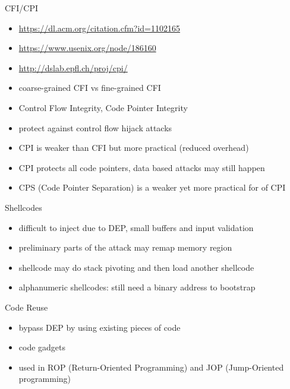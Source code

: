 \documentclass{curs}
\begin{document}
\begin{frame}{CFI/CPI}
  \begin{itemize}
    \item \url{https://dl.acm.org/citation.cfm?id=1102165}
    \item \url{https://www.usenix.org/node/186160}
    \item \url{http://dslab.epfl.ch/proj/cpi/}
    \item coarse-grained CFI vs fine-grained CFI
    \item Control Flow Integrity, Code Pointer Integrity
    \item protect against control flow hijack attacks
    \item CPI is weaker than CFI but more practical (reduced overhead)
    \item CPI protects all code pointers, data based attacks may still happen
    \item CPS (Code Pointer Separation) is a weaker yet more practical for of CPI
  \end{itemize}
\end{frame}

\begin{frame}{Shellcodes}
  \begin{itemize}
    \item difficult to inject due to DEP, small buffers and input validation
    \item preliminary parts of the attack may remap memory region
    \item shellcode may do stack pivoting and then load another shellcode
    \item alphanumeric shellcodes: still need a binary address to bootstrap
  \end{itemize}
\end{frame}

\begin{frame}{Code Reuse}
  \begin{itemize}
    \item bypass DEP by using existing pieces of code
    \item code gadgets
    \item used in ROP (Return-Oriented Programming) and JOP (Jump-Oriented programming)
  \end{itemize}
\end{frame}
\end{document}
